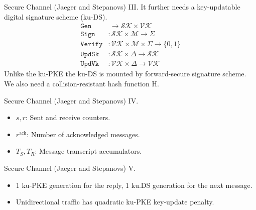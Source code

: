 \documentclass{beamer}
\renewcommand{\t}{\text}
\begin{document}
\begin{frame}{Secure Channel (Jaeger and Stepanovs) III.}
  It further needs a key-updatable digital signature scheme (ku-DS).
  \begin{align*}
    \texttt{Gen} & \  \rightarrow \mathcal{SK} \times \mathcal{VK} \\
    \texttt{Sign} & : \mathcal{SK} \times \mathcal{M} \rightarrow \Sigma \\
    \texttt{Verify} & : \mathcal{VK} \times \mathcal{M} \times \Sigma \rightarrow \{0,1\} \\
    \texttt{UpdSk} & : \mathcal{SK} \times \Delta \rightarrow \mathcal{SK} \\
    \texttt{UpdVk} & : \mathcal{VK} \times \Delta \rightarrow \mathcal{VK}
  \end{align*}
  Unlike the ku-PKE the ku-DS is mounted by forward-secure signature scheme.
  We also need a collision-resistant hash function H.
\end{frame}

\begin{frame}{Secure Channel (Jaeger and Stepanovs) IV.}
  \scriptsize
  \begin{minipage}[h]{0.65\textwidth}
      \begin{figure}[h]
        \centering
        \setlength{\fboxsep}{10pt}
        \scalebox{0.7}{%
        \fbox{%
          
        }
      }
    \end{figure}
    \end{minipage}
  \begin{minipage}[h]{0.34\textwidth}
      \begin{itemize}
      \item $s, r$: Sent and receive counters.
      \item $r^\t{ack}$: Number of acknowledged messages.
      \item $T_S,T_R$: Message transcript accumulators.
      \end{itemize}
    \end{minipage}
\end{frame}

\begin{frame}{Secure Channel (Jaeger and Stepanovs) V.}
  \scriptsize
  \begin{minipage}[ht]{0.59\textwidth}
      \begin{figure}[ht]
        \centering
        \setlength{\fboxsep}{10pt}
        \scalebox{0.7}{%
        \fbox{%
          
        }
      }
    \end{figure}
    \end{minipage}
  \begin{minipage}[ht]{0.40\textwidth}
      \begin{itemize}
      \item 1 ku-PKE generation for the reply, 1 ku.DS generation for the next message.
      \item Unidirectional traffic has quadratic ku-PKE key-update penalty.
      \end{itemize}
    \end{minipage}
\end{frame}
\end{document}
